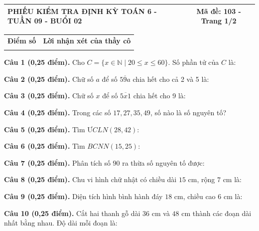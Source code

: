 \documentclass[12pt,a4paper]{article}
\begin{document}
\newpage
\noindent
\begin{tabularx}{\linewidth}{|X|c|}
\hline
\textbf{PHIẾU KIỂM TRA ĐỊNH KỲ TOÁN 6 - TUẦN 09 - BUỔI 02} & \textbf{Mã đề: 103 - Trang 1/2} \\
\hline
\end{tabularx}

\vspace{1.0mm}

\noindent
\begin{tabularx}{\linewidth}{|p{3.2cm}|X|}
\hline
\centering\textbf{Điểm số} & \centering\textbf{Lời nhận xét của thầy cô} \tabularnewline
\rule{0pt}{1.8cm} & \\
\hline
\end{tabularx}

\vspace{1.0mm}

\noindent\textbf{Câu 1 (0,25 điểm).} Cho $C = \{x \in \mathbb{N} \mid 20 \le x \le 60\}$. Số phần tử của $C$ là: \par\vspace{0.25mm}
\noindent\textbf{Câu 2 (0,25 điểm).} Chữ số $a$ để số $\overline{59a}$ chia hết cho cả 2 và 5 là: \par\vspace{0.25mm}
\noindent\textbf{Câu 3 (0,25 điểm).} Chữ số $x$ để số $\overline{5x1}$ chia hết cho 9 là: \par\vspace{0.25mm}
\noindent\textbf{Câu 4 (0,25 điểm).} Trong các số $17, 27, 35, 49$, số nào là số nguyên tố? \par\vspace{0.25mm}
\noindent\textbf{Câu 5 (0,25 điểm).} Tìm $ƯCLN(28, 42)$: \par\vspace{0.25mm}
\noindent\textbf{Câu 6 (0,25 điểm).} Tìm $BCNN(15, 25)$: \par\vspace{0.25mm}
\noindent\textbf{Câu 7 (0,25 điểm).} Phân tích số $90$ ra thừa số nguyên tố được: \par\vspace{0.25mm}
\noindent\textbf{Câu 8 (0,25 điểm).} Chu vi hình chữ nhật có chiều dài $15\text{ cm}$, rộng $7\text{ cm}$ là: \par\vspace{0.25mm}
\noindent\textbf{Câu 9 (0,25 điểm).} Diện tích hình bình hành đáy $18\text{ cm}$, chiều cao $6\text{ cm}$ là: \par\vspace{0.25mm}
\noindent\textbf{Câu 10 (0,25 điểm).} Cắt hai thanh gỗ dài $36\text{ cm}$ và $48\text{ cm}$ thành các đoạn dài nhất bằng nhau. Độ dài mỗi đoạn là: \par\vspace{0.25mm}
\end{document}
